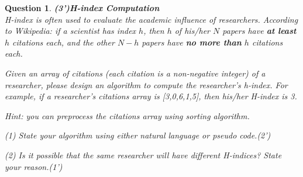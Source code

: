 \documentclass[10.5pt]{article}
\newtheorem{Q}{Question}
\begin{document}
	\begin{Q}\textbf{(3')H-index Computation}\\
        H-index is often used to evaluate the academic influence of researchers. According to Wikipedia: if a scientist has index $h$, then $h$ of his/her $N$ papers have \textbf{at least} $h$ citations each, and the other $N-h$ papers have \textbf{no more than} $h$ citations each. 
        
        Given an array of citations (each citation is a non-negative integer) of a researcher, please design an algorithm to compute the researcher's h-index. For example, if a researcher's citations array is [3,0,6,1,5], then his/her H-index is 3. 
        
        Hint: you can preprocess the citations array using sorting algorithm. 
        
        (1) State your algorithm using either natural language or pseudo code.(2')
        \vspace{5cm}
        
        (2) Is it possible that the same researcher will have different H-indices? State your reason.(1')
        \vspace{3cm}
	\end{Q}
	
	
	
\pagebreak
	
\end{document}
